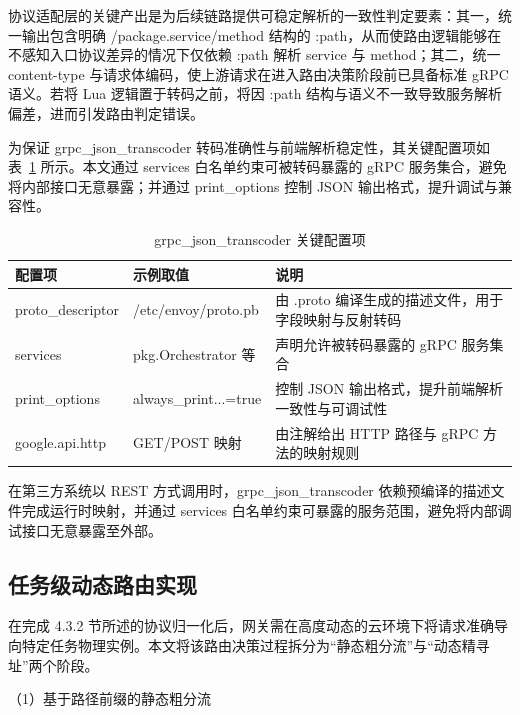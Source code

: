 \documentclass[lang=chs, degree=master, blindreview=true, winfonts=true, academic=false]{yanputhesis}
\begin{document}
协议适配层的关键产出是为后续链路提供可稳定解析的一致性判定要素：其一，统一输出包含明确 /package.service/method 结构的 :path，从而使路由逻辑能够在不感知入口协议差异的情况下仅依赖 :path 解析 service 与 method；其二，统一 content-type 与请求体编码，使上游请求在进入路由决策阶段前已具备标准 gRPC 语义。若将 Lua 逻辑置于转码之前，将因 :path 结构与语义不一致导致服务解析偏差，进而引发路由判定错误。

为保证 grpc\_json\_transcoder 转码准确性与前端解析稳定性，其关键配置项如表~\ref{tab:4_grpc_json_transcoder_config} 所示。本文通过 services 白名单约束可被转码暴露的 gRPC 服务集合，避免将内部接口无意暴露；并通过 print\_options 控制 JSON 输出格式，提升调试与兼容性。
\begin{table}[!h]
    \centering
    \caption{grpc\_json\_transcoder 关键配置项}
    \label{tab:4_grpc_json_transcoder_config}
    \begin{tabularx}{\textwidth}{>{\centering\arraybackslash}p{}
                                  >{\centering\arraybackslash}p{}
                                  >{\centering\arraybackslash}X}
        \toprule
        配置项 & 示例取值 & 说明 \\ \midrule
        proto\_descriptor & /etc/envoy/proto.pb & 由 .proto 编译生成的描述文件，用于字段映射与反射转码 \\
        services & pkg.Orchestrator 等 & 声明允许被转码暴露的 gRPC 服务集合 \\
        print\_options & always\_print...=true & 控制 JSON 输出格式，提升前端解析一致性与可调试性 \\
        google.api.http & GET/POST 映射 & 由注解给出 HTTP 路径与 gRPC 方法的映射规则 \\
        \bottomrule
    \end{tabularx}
\end{table}
在第三方系统以 REST 方式调用时，grpc\_json\_transcoder 依赖预编译的描述文件完成运行时映射，并通过 services 白名单约束可暴露的服务范围，避免将内部调试接口无意暴露至外部。




\subsection{任务级动态路由实现}

在完成 4.3.2 节所述的协议归一化后，网关需在高度动态的云环境下将请求准确导向特定任务物理实例。本文将该路由决策过程拆分为“静态粗分流”与“动态精寻址”两个阶段。

（1）基于路径前缀的静态粗分流
\end{document}
